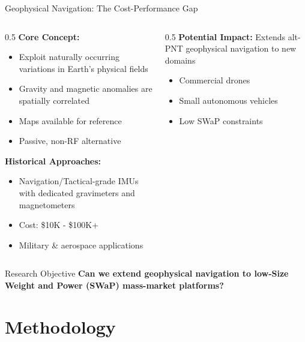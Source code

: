 \documentclass[aspectratio=169]{beamer}
\begin{document}
\begin{frame}{Geophysical Navigation: The Cost-Performance Gap}
\begin{columns}[t]
\begin{column}{0.5\textwidth}
\textbf{Core Concept:}
\begin{itemize}
    \item Exploit naturally occurring variations in Earth's physical fields
    \item Gravity and magnetic anomalies are spatially correlated
    \item Maps available for reference
    \item Passive, non-RF alternative
\end{itemize}
\pause
\textbf{Historical Approaches:}
\begin{itemize}
    \item Navigation/Tactical-grade IMUs with dedicated gravimeters and magnetometers
    \item Cost: \$10K - \$100K+
    \item Military \& aerospace applications
\end{itemize}
\end{column}
\begin{column}{0.5\textwidth} \pause
\textbf{Potential Impact:} Extends alt-PNT geophysical navigation to new domains
\begin{itemize}
    \item Commercial drones
    \item Small autonomous vehicles
    \item Low SWaP constraints
\end{itemize}
\end{column}
\end{columns}
\end{frame}
\begin{frame}{Research Objective}
    \centering
    \textbf{Can we extend geophysical navigation to low-Size Weight and Power (SWaP) mass-market platforms?}
\end{frame}

\section{Methodology}
\end{document}
